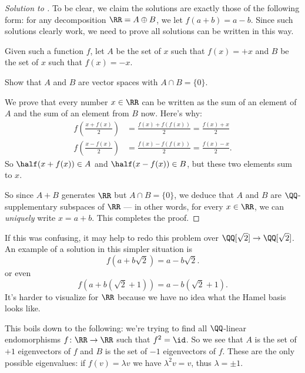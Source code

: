 \documentclass[11pt]{scrartcl}
\begin{document}
\begin{proof}[Solution to ]
  To be clear, we claim the solutions are exactly those of the following form:
  for any decomposition $\RR = A \oplus B$,
  we let $f(a+b) = a-b$.
  Since such solutions clearly work, we need to prove all solutions
  can be written in this way.

  Given such a function $f$,
  let $A$ be the set of $x$ such that $f(x) = +x$
  and $B$ be the set of $x$ such that $f(x) = -x$.
  \begin{exercise}
    Show that $A$ and $B$ are vector spaces with $A \cap B = \{0\}$.
  \end{exercise}

  We prove that every number $x \in \RR$ can be written as the sum of an element of $A$
  and the sum of an element from $B$ now.
  Here's why:
  \begin{align*}
    f\left( \frac{x+f(x)}{2} \right) &= \frac{f(x)+f(f(x))}{2} = \frac{f(x)+x}{2} \\
    f\left( \frac{x-f(x)}{2} \right) &= \frac{f(x)-f(f(x))}{2} = \frac{f(x)-x}{2}.
  \end{align*}
  So $\half(x+f(x)) \in A$ and $\half(x-f(x)) \in B$, but these two elements sum to $x$.

  So since $A+B$ generates $\RR$ but $A \cap B = \{0\}$,
  we deduce that $A$ and $B$ are $\QQ$-supplementary subspaces of $\RR$
  --- in other words, for every $x \in \RR$,
  we can \emph{uniquely} write $x = a + b$.
  This completes the proof.
\end{proof}

If this was confusing, it may help to redo this problem over $\QQ[\sqrt2] \to \QQ[\sqrt2]$.
An example of a solution in this simpler situation is
\[ f(a+b\sqrt2) = a-b\sqrt2. \]
or even
\[ f(a+b(\sqrt2+1)) = a-b(\sqrt2+1). \]
It's harder to visualize for $\RR$ because we have no idea what the Hamel basis looks like.

\begin{remark}
  This boils down to the following: we're trying to find all $\QQ$-linear endomorphisms
  $f \colon \RR \to \RR$ such that $f^2 = \id$.
  So we see that $A$ is the set of $+1$ eigenvectors of $f$
  and $B$ is the set of $-1$ eigenvectors of $f$.
  These are the only possible eigenvalues:
  if $f(v) = \lambda v$ we have $\lambda^2 v = v$,
  thus $\lambda = \pm 1$.
\end{remark}
\end{document}

